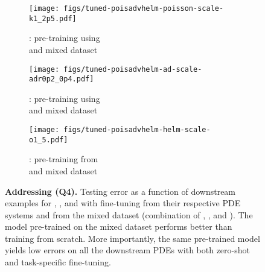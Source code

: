 \begin{figure}[!ht]
  \begin{subfigure}{.46\textwidth}
  \centering
  \texttt{[image: figs/tuned-poisadvhelm-poisson-scale-k1\_2p5.pdf]}  
  \caption{
      \sysAonetwoptfive{}: pre-training using \sysAonefive{} \\ and mixed dataset}
  \label{fig:poisson-k1-2p5-mix}
\end{subfigure}
\begin{subfigure}{.46\textwidth}
  \centering
  \texttt{[image: figs/tuned-poisadvhelm-ad-scale-adr0p2\_0p4.pdf]}  
  \caption{\sysBzeropttwozeroptfour{}: pre-training using \\ \sysBzeropttwoone{}  and mixed dataset}
  \label{fig:ad-0p2-0p4-mix}
\end{subfigure}
\begin{subfigure}{.46\textwidth}
  \centering
  \texttt{[image: figs/tuned-poisadvhelm-helm-scale-o1\_5.pdf]} 
  \caption{\sysConefive{}: pre-training from \sysConeten{} \\ and mixed dataset}
  \label{fig:helm-o1-5-mix}
\end{subfigure}
\caption{\textbf{Addressing (Q4).} Testing error as a function of downstream examples  for \sysA{}, \sysB{}, and \sysC{} with fine-tuning from their respective PDE systems and from the mixed dataset (combination of \sysA{}, \sysB{}, and \sysC{}). The model pre-trained on the mixed dataset performs better than training from scratch. More importantly, the same pre-trained model yields low errors on all the downstream PDEs with both zero-shot and task-specific fine-tuning. 
}
\label{fig:Q4}
\end{figure}

